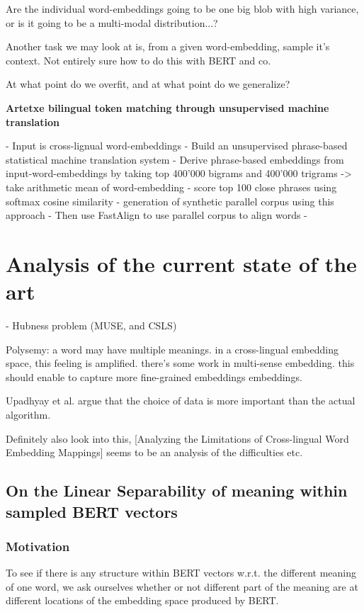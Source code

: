 \documentclass[a4paper,12pt,twoside,openright]{report}
\begin{document}
Are the individual word-embeddings going to be one big blob with high variance, or is it going to be a multi-modal distribution...?

Another task we may look at is, from a given word-embedding, sample it's context. 
Not entirely sure how to do this with BERT and co.

At what point do we overfit, and at what point do we generalize?


\textbf{Artetxe bilingual token matching through unsupervised machine translation}

- Input is cross-lignual word-embeddings
- Build an unsupervised phrase-based statistical machine translation system
- Derive phrase-based embeddings from input-word-embeddings by taking top 400'000 bigrams and 400'000 trigrams -> take arithmetic mean of word-embedding
- score top 100 close phrases using softmax cosine similarity
- generation of synthetic parallel corpus using this approach
- Then use FastAlign to use parallel corpus to align words
- 

\chapter{Analysis of the current state of the art}
- Hubness problem (MUSE, and CSLS)

Polysemy:
a word may have multiple meanings.
in a cross-lingual embedding space, this feeling is amplified.
there's some work in multi-sense embedding.
this should enable to capture more fine-grained embeddings embeddings.

Upadhyay et al. argue that the choice of data is more important than the actual algorithm.

Definitely also look into this, [Analyzing the Limitations of Cross-lingual Word Embedding Mappings] seems to be an analysis of the difficulties etc. 

\section{On the Linear Separability of meaning within sampled BERT vectors}

\subsection{Motivation}

To see if there is any structure within BERT vectors w.r.t. the different meaning of one word, we ask ourselves whether or not different part of the meaning are at different locations of the embedding space produced by BERT.
\end{document}
